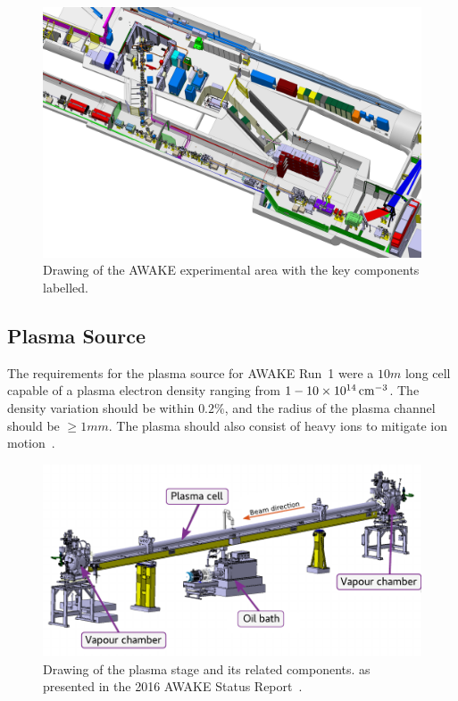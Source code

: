 \begin{figure}[hbt]
    \centering
    \includegraphics[width=0.99\linewidth,trim={0mm 0mm 0mm 0mm},clip]{figures/AwakeExperiment}
    \caption{\label{Fig:WFA:AWAKE}
        Drawing of the AWAKE experimental area with the key components labelled.
    }
\end{figure}

\subsection{Plasma Source}
\label{WFA:Design:Plasma}

The requirements for the plasma source for AWAKE Run~1 were a $10\unit{m}$ long cell capable of a plasma electron density ranging from $1-10\times 10^{14}\,\mathrm{cm}^{-3}$.
The density variation should be within $0.2\%$, and the radius of the plasma channel should be $\geq 1\unit{mm}$.
The plasma should also consist of heavy ions to mitigate ion motion~\cite{caldwell:2015}.

\begin{figure}[hbt]
    \centering
    \includegraphics[width=0.99\linewidth,trim={0mm 0mm 0mm 0mm},clip]{figures/PlasmaCell}
    \caption{\label{Fig:WFA:PlasmaCell}
        Drawing of the plasma stage and its related components. as presented in the 2016 AWAKE Status Report~\cite{awake_collaboration:2016}.
    }
\end{figure}

